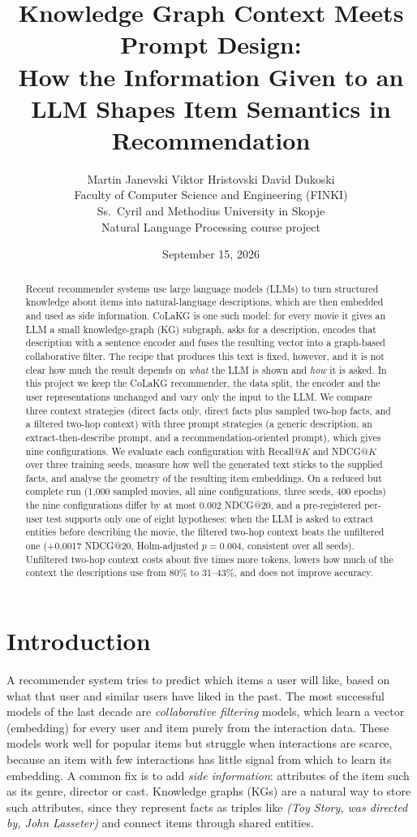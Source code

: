 \documentclass[a4paper,11pt]{article}
\title{Knowledge Graph Context Meets Prompt Design:\\ How the Information Given to an LLM Shapes Item Semantics in Recommendation}
\author{Martin Janevski \quad Viktor Hristovski \quad David Dukoski\\[4pt]
\small Faculty of Computer Science and Engineering (FINKI)\\
\small Ss.\ Cyril and Methodius University in Skopje\\
\small Natural Language Processing course project}
\date{September 15, 2026}
\begin{document}
\maketitle

\begin{abstract}
Recent recommender systems use large language models (LLMs) to turn structured knowledge about items into natural-language descriptions, which are then embedded and used as side information. CoLaKG is one such model: for every movie it gives an LLM a small knowledge-graph (KG) subgraph, asks for a description, encodes that description with a sentence encoder and fuses the resulting vector into a graph-based collaborative filter. The recipe that produces this text is fixed, however, and it is not clear how much the result depends on \emph{what} the LLM is shown and \emph{how} it is asked. In this project we keep the CoLaKG recommender, the data split, the encoder and the user representations unchanged and vary only the input to the LLM. We compare three context strategies (direct facts only, direct facts plus sampled two-hop facts, and a filtered two-hop context) with three prompt strategies (a generic description, an extract-then-describe prompt, and a recommendation-oriented prompt), which gives nine configurations. We evaluate each configuration with Recall@$K$ and NDCG@$K$ over three training seeds, measure how well the generated text sticks to the supplied facts, and analyse the geometry of the resulting item embeddings. On a reduced but complete run (1,000 sampled movies, all nine configurations, three seeds, 400 epochs) the nine configurations differ by at most 0.002 NDCG@20, and a pre-registered per-user test supports only one of eight hypotheses: when the LLM is asked to extract entities before describing the movie, the filtered two-hop context beats the unfiltered one (+0.0017 NDCG@20, Holm-adjusted $p=0.004$, consistent over all seeds). Unfiltered two-hop context costs about five times more tokens, lowers how much of the context the descriptions use from 80\% to 31--43\%, and does not improve accuracy.
\end{abstract}

\section{Introduction}
\label{sec:intro}
A recommender system tries to predict which items a user will like, based on what that user and similar users have liked in the past. The most successful models of the last decade are \emph{collaborative filtering} models, which learn a vector (embedding) for every user and item purely from the interaction data. These models work well for popular items but struggle when interactions are scarce, because an item with few interactions has little signal from which to learn its embedding. A common fix is to add \emph{side information}: attributes of the item such as its genre, director or cast. Knowledge graphs (KGs) are a natural way to store such attributes, since they represent facts as triples like \emph{(Toy Story, was directed by, John Lasseter)} and connect items through shared entities.
\end{document}
